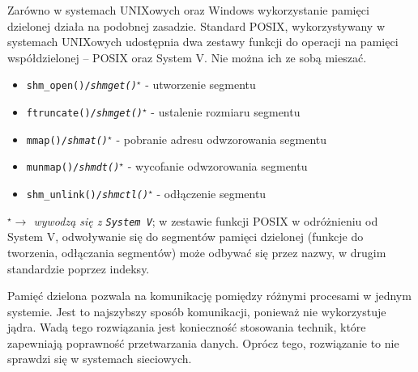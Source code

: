 Zarówno w systemach UNIXowych oraz Windows wykorzystanie pamięci dzielonej działa na podobnej zasadzie. Standard POSIX, wykorzystywany w systemach UNIXowych udostępnia dwa zestawy funkcji do operacji na pamięci współdzielonej -- POSIX oraz System V. Nie można ich ze sobą mieszać.
\begin{itemize}
\item \texttt{shm\_open()/\textit{shmget()$^\star$}} - utworzenie segmentu
\item \texttt{ftruncate()/\textit{shmget()$^\star$}} - ustalenie rozmiaru segmentu
\item \texttt{mmap()/\textit{shmat()$^\star$}} - pobranie adresu odwzorowania segmentu
\item \texttt{munmap()/\textit{shmdt()$^\star$}} - wycofanie odwzorowania segmentu
\item \texttt{shm\_unlink()/\textit{shmctl()$^\star$}} - odłączenie segmentu
\end{itemize}
\textit{$^\star \to$ wywodzą się z \texttt{System V}};
w zestawie funkcji POSIX w odróżnieniu od System V, odwoływanie się do segmentów pamięci dzielonej (funkcje do tworzenia, odłączania segmentów) może odbywać się przez nazwy, w drugim standardzie poprzez indeksy.

Pamięć dzielona pozwala na komunikację pomiędzy różnymi procesami w jednym systemie. Jest to najszybszy sposób komunikacji, ponieważ nie wykorzystuje jądra. Wadą tego rozwiązania jest konieczność stosowania technik, które zapewniają poprawność przetwarzania danych. Oprócz tego, rozwiązanie to nie sprawdzi się w systemach sieciowych.